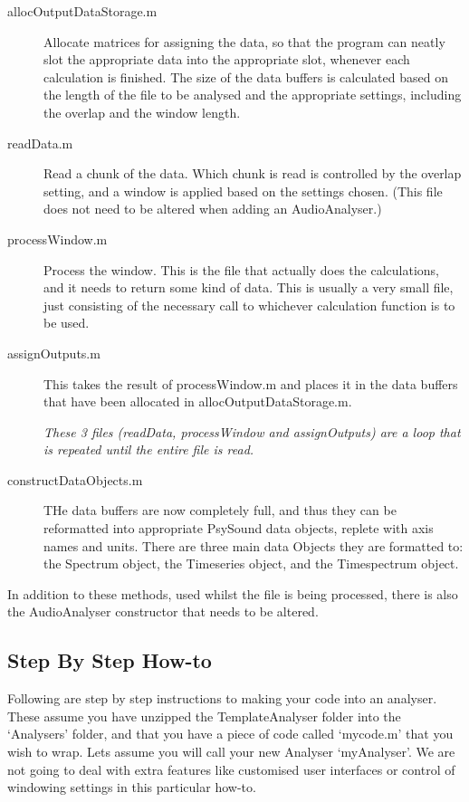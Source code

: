 \documentclass{article}
\begin{document}
\begin{description}
	
\item[allocOutputDataStorage.m] Allocate matrices for assigning the data, so that the program can neatly slot the appropriate data into the appropriate slot, whenever each calculation is finished. The size of the data buffers is calculated based on the length of the file to be analysed and the appropriate settings, including the overlap and the window length. 

\item[readData.m] Read a chunk of the data. Which chunk is read is controlled by the overlap setting, and a window is applied based on the settings chosen. (This file does not need to be altered when adding an AudioAnalyser.)

\item[processWindow.m] Process the window. This is the file that actually does the calculations, and it needs to return some kind of data. This is usually a very small file, just consisting of the necessary call to whichever calculation function is to be used. 

\item[assignOutputs.m] This takes the result of processWindow.m and places it in the data buffers that have been allocated in allocOutputDataStorage.m. 

\emph{These 3 files (readData, processWindow and assignOutputs) are a loop that is repeated until the entire file is read.}

\item[constructDataObjects.m] THe data buffers are now completely full, and thus they can be reformatted into appropriate PsySound data objects, replete with axis names and units. There are three main data Objects they are formatted to: the Spectrum object, the Timeseries object, and the Timespectrum object.

\end{description}

In addition to these methods, used whilst the file is being processed, there is also the AudioAnalyser constructor that needs to be altered. 

\subsection{Step By Step How-to}

Following are step by step instructions to making your code into an analyser. These assume you have unzipped the TemplateAnalyser folder into the `Analysers' folder, and that you have a piece of code called `mycode.m' that you wish to wrap. Lets assume you will call your new Analyser  `myAnalyser'. We are not going to deal with extra features like customised user interfaces or control of windowing settings in this particular how-to. 
\end{document}
